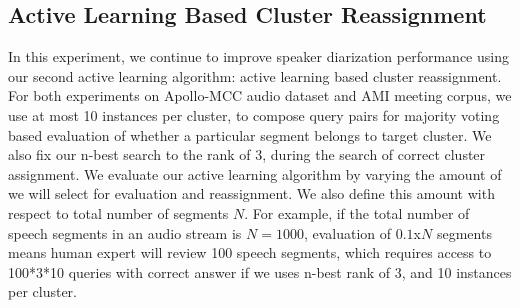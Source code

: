 \documentclass[journal]{IEEEtran}
\begin{document}




\subsection{Active Learning Based Cluster Reassignment}
In this experiment, we continue to improve speaker diarization performance using our second active learning algorithm: active learning based cluster reassignment. For both experiments on Apollo-MCC audio dataset and AMI meeting corpus, we use at most 10 instances per cluster, to compose query pairs for majority voting based evaluation of whether a particular segment belongs to target cluster. We also fix our n-best search to the rank of 3, during the search of correct cluster assignment. We evaluate our active learning algorithm by varying the amount of we will select for evaluation and reassignment. We also define this amount with respect to total number of segments $N$. For example, if the total number of speech segments in an audio stream is $N=1000$,  evaluation of $0.1$x$N$ segments means human expert will review 100 speech segments, which requires access to 100*3*10 queries with correct answer if we uses n-best rank of 3, and 10 instances per cluster.
\end{document}
